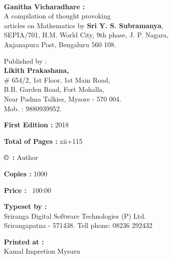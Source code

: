 ~
\thispagestyle{empty}

\begin{center}
{\rm {\bfseries Ganitha Vicharadhare :} \\
A compilation of thought provoking\\
 articles on Mathematics by {\bfseries Sri Y. S. Subramanya},\\
  SEPIA/701, H.M. World City, 9th phase, J. P. Nagara,\\
   Anjanapura Post, Bengaluru 560 108.}
   \end{center}

\begin{center}
 {\rm Published by :\\
  {\bfseries Likith Prakashana,} \\
   \# 654/2, 1st Floor, 1st Main Road,\\
    B.B. Garden Road, Fort Mohalla, \\
    Near Padma Talkies, Mysore - 570 004.\\
     Mob. : 9880939952.}
     \end{center}

\vfill

\begin{center}
{\rm {\bfseries First Edition :} 2018}

\vfill

{\rm {\bfseries Total of Pages :} xii+115}

\vfill

{\rm {\bfseries \copyright ~:} Author}

\vfill

{\rm {\bfseries Copies :} 1000}

\vfill

{\rm {\bfseries Price :}  \rupee\ 100:00}



\vfill


\begin{center}
{\rm {\bfseries Typeset by :}\\
 Sriranga Digital Software Technologies (P) Ltd.\\
 Srirangapatna - 571438. Tell phone: 08236 292432}
\end{center}


\vfill


{\rm {\bfseries Printed at :}\\
 Kamal Impretion Mysuru}
\end{center}
\vfill\eject
